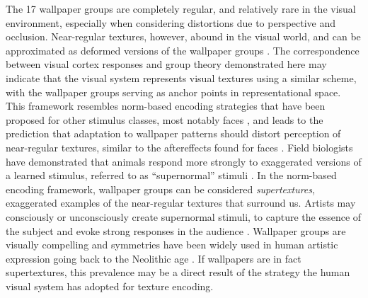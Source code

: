 \documentclass[9pt,twocolumn,twoside,lineno]{pnas-new}
\begin{document}
The 17 wallpaper groups are completely regular, and relatively rare in the visual environment, especially when considering distortions due to perspective and occlusion. Near-regular textures, however, abound in the visual world, and can be approximated as deformed versions of the wallpaper groups \cite{RN1519}. The correspondence between visual cortex responses and group theory demonstrated here may indicate that the visual system represents visual textures using a similar scheme, with the wallpaper groups serving as anchor points in representational space. This framework resembles norm-based encoding strategies that have been proposed for other stimulus classes, most notably faces \cite{RN435}, and leads to the prediction that adaptation to wallpaper patterns should distort perception of near-regular textures, similar to the aftereffects found for faces \cite{RN1768}. Field biologists have demonstrated that animals respond more strongly to exaggerated versions of a learned stimulus, referred to as “supernormal” stimuli \cite{RN1775}. In the norm-based encoding framework, wallpaper groups can be considered \textit{supertextures}, exaggerated examples of the near-regular textures that surround us. Artists may consciously or unconsciously create supernormal stimuli, to capture the essence of the subject and evoke strong responses in the audience \cite{RN1764}. Wallpaper groups are visually compelling and symmetries have been widely used in human artistic expression going back to the Neolithic age \cite{RN1949}. If wallpapers are in fact supertextures, this prevalence may be a direct result of the strategy the human visual system has adopted for texture encoding. 
\end{document}

